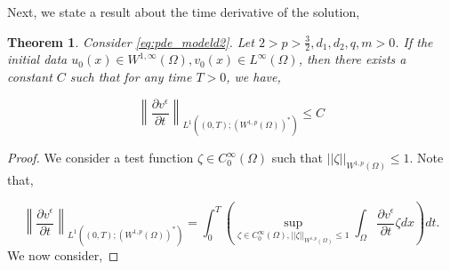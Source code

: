 \documentclass[10pt]{amsart}
\theoremstyle{plain}
\newtheorem{theorem}{Theorem}[section]
\theoremstyle{definition}
\begin{document}
Next, we state a result about the time derivative of the solution,

\begin{theorem}
\label{thm:w1s}
    Consider \eqref{eq:pde_modeld2}. Let $2>p>\frac{3}{2}, d_{1}, d_{2}, q,m>0$. If the initial data $u_{0}(x) \in W^{1,\infty}(\Omega), v_{0}(x) \in L^{\infty}(\Omega)$, then there exists a constant $C$ such that for any time $T > 0$, we have,

     \begin{equation} 
\left \lVert \frac{\partial v^{\epsilon}}{\partial t}\right \rVert_{L^{1}((0,T); (W^{1,p}(\Omega))^{*})} \leq C
\end{equation}

\end{theorem}

\begin{proof}
We consider a test function $\zeta \in C^{\infty}_{0}(\Omega)$ such that $||\zeta||_{W^{1,p}(\Omega)} \leq 1$. Note that,

 \begin{equation} 
\left \lVert \frac{\partial v^{\epsilon}}{\partial t}\right \rVert_{L^{1}((0,T); (W^{1,p}(\Omega))^{*})} = \int^{T}_{0}\left( \sup_{\zeta \in C^{\infty}_{0}(\Omega),||\zeta||_{W^{1,p}(\Omega)} \leq 1 } \int_{\Omega} \frac{\partial v^{\epsilon}}{\partial t} \zeta dx\right) dt.
\end{equation}
%
We now consider,


\end{proof}
\end{document}

